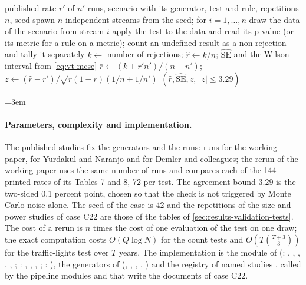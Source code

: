 \begin{algorithm}[htbp]
\caption{Rerun of one cell of a published simulation study.}
\label{alg:vt-rerun}
\begin{algorithmic}[1]
\Require published rate $r'$ of $n'$ runs, scenario with its generator, test and rule, repetitions $n$, seed
\State spawn $n$ independent streams from the seed; for $i=1,\dots,n$ draw the data of the scenario from stream $i$
  \State apply the test to the data and read its p-value (or its metric for a rule on a metric); count an undefined result as a non-rejection and tally it separately
\EndFor
\State $k\gets$ number of rejections; $\hat r\gets k/n$; $\widehat{\mathrm{SE}}$ and the Wilson interval from \cref{eq:vt-mcse}
\State $\bar r\gets(k+r'n')/(n+n')$; $z\gets(\hat r-r')/\sqrt{\bar r(1-\bar r)(1/n+1/n')}$
\State \Return $(\hat r,\widehat{\mathrm{SE}},z,\ |z|\le3.29)$
\end{algorithmic}
\end{algorithm}

\begingroup\emergencystretch=3em
\paragraph{Parameters, complexity and implementation.} The published studies fix the generators and the runs: \vtWpRuns{} runs for the working paper, \vtYnRuns{} for Yurdakul and Naranjo and \vtDmRuns{} for Demler and colleagues; the rerun of the working paper uses the same number of runs and compares each of the 144 printed rates of its Tables 7 and 8, 72 per test. The agreement bound 3.29 is the two-sided 0.1 percent
point, chosen so that the check is not triggered by Monte Carlo noise alone. The seed of the case is 42 and the repetitions of the size and power studies of case C22 are those of the tables of \cref{sec:results-validation-tests}. The cost of a rerun is $n$ times the cost of one evaluation of the test on one draw; the exact computation costs $O(Q\log N)$ for the count tests and $O(T\binom{T+3}{3})$ for the traffic-lights test over $T$ years. The implementation is
the module  of  \vtEngineVersion{} (: , , , , , ; : , , , ; : ),
the generators of  (, , , , ) and the registry of named studies , called by the pipeline modules  and  that write the documents of case C22.
\par\endgroup

